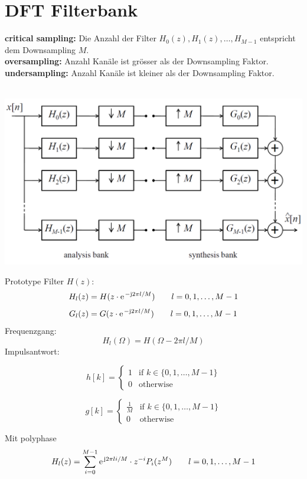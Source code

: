 \section{DFT Filterbank}
\textbf{critical sampling:} Die Anzahl der Filter $H_0(z), H_1(z), \ldots, H_
{M-1}$ entspricht dem Downsampling $M$.\\
\textbf{oversampling:} Anzahl Kanäle ist grösser als der Downsampling Faktor.\\
\textbf{undersampling:} Anzahl Kanäle ist kleiner als der Downsampling Faktor.\\
\\
\begin{center}
	\includegraphics[scale=.7]{../fig/critical_sampled}
\end{center}
Prototype Filter $H(z)$:
\[ H_l(z) = H(z\cdot\e^{-\im 2\pi l/M}) \qquad l=0,1,\ldots,M-1 \]
\[ G_l(z) = G(z\cdot\e^{-\im 2\pi l/M}) \qquad l=0,1,\ldots,M-1 \]
Frequenzgang:
\[ H_l(\Omega) = H(\Omega-2\pi l/M) \]
Impulsantwort:\\
\begin{minipage}{.5\textwidth}
	\[ h[k] = \left\lbrace\begin{matrix}
		1	& \textrm{if } k \in \{0,1,\ldots,M-1\}\\
		0	& \textrm{otherwise}
	\end{matrix}\right. \]
\end{minipage}
\begin{minipage}{.5\textwidth}
	\[ g[k] = \left\lbrace\begin{matrix}
		\frac{1}{M}	& \textrm{if } k \in \{0,1,\ldots,M-1\}\\
		0	& \textrm{otherwise}
	\end{matrix}\right. \]
\end{minipage}
Mit polyphase
\[ H_l(z) = \sum_{i=0}^{M-1}\e^{\im 2\pi li/M} \cdot z^{-i} P_i(z^M) 
	\qquad l=0,1,\ldots,M-1 \]
